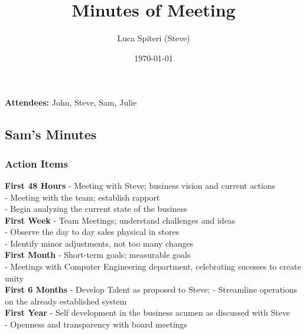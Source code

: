 \documentclass[a4paper,12pt]{article}
\title{Minutes of Meeting}
\date{\today}
\begin{document}
\maketitle

\begingroup
\large
\textbf{Attendees:} John, Steve, Sam, Julie
\endgroup

\subsection{Sam's Minutes}
\author{Luca Spiteri (Steve)}

\subsubsection{Action Items}
\textbf{First 48 Hours}
- Meeting with Steve; business vision and current actions \\
- Meeting with the team; establish rapport \\
- Begin analyzing the current state of the business \\

\textbf{First Week}
- Team Meetings; understand challenges and ideas \\
- Observe the day to day sales physical in stores \\
- Identify minor adjustments, not too many changes \\

\textbf{First Month}
- Short-term goals; measurable goals \\
- Meetings with Computer Engineering department, celebrating sucesses to create unity \\

\textbf{First 6 Months}
- Develop Talent as proposed to Steve;
- Streamline operations on the already established system \\

\textbf{First Year}
- Self development in the business acumen as discussed with Steve \\
- Openness and transparency with board meetings \\
\end{document}
